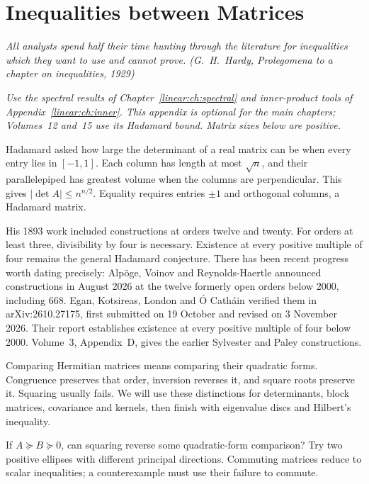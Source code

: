 \chapter{Inequalities between Matrices}\label{linear:ch:inequalities}

\begin{center}\itshape
All analysts spend half their time hunting through the literature for inequalities which they want to use and cannot prove.
\upshape(G.~H.~Hardy, \emph{Prolegomena to a chapter on inequalities}, 1929)
\end{center}
\noindent\emph{Use the spectral results of Chapter~\ref{linear:ch:spectral} and inner-product tools of Appendix~\ref{linear:ch:inner}. This appendix is optional for the main chapters; Volumes~12 and~15 use its Hadamard bound. Matrix sizes below are positive.}

Hadamard asked how large the determinant of a real matrix can be when every entry lies in $[-1,1]$. Each column has length at most $\sqrt n$, and their parallelepiped has greatest volume when the columns are perpendicular. This gives $|\det A|\le n^{n/2}$. Equality requires entries $\pm1$ and orthogonal columns, a Hadamard matrix.

His 1893 work included constructions at orders twelve and twenty. For orders at least three, divisibility by four is necessary. Existence at every positive multiple of four remains the general Hadamard conjecture. There has been recent progress worth dating precisely: Alpöge, Voinov and Reynolds-Haertle announced constructions in August 2026 at the twelve formerly open orders below 2000, including 668. Egan, Kotsireas, London and \'O Cath\'ain verified them in arXiv:2610.27175, first submitted on 19 October and revised on 3 November 2026. Their report establishes existence at every positive multiple of four below 2000. Volume~3, Appendix~D, gives the earlier Sylvester and Paley constructions.

Comparing Hermitian matrices means comparing their quadratic forms. Congruence preserves that order, inversion reverses it, and square roots preserve it. Squaring usually fails. We will use these distinctions for determinants, block matrices, covariance and kernels, then finish with eigenvalue discs and Hilbert's inequality.

\begin{think}
If $A\succeq B\succeq0$, can squaring reverse some quadratic-form comparison? Try two positive ellipses with different principal directions. Commuting matrices reduce to scalar inequalities; a counterexample must use their failure to commute.
\end{think}

